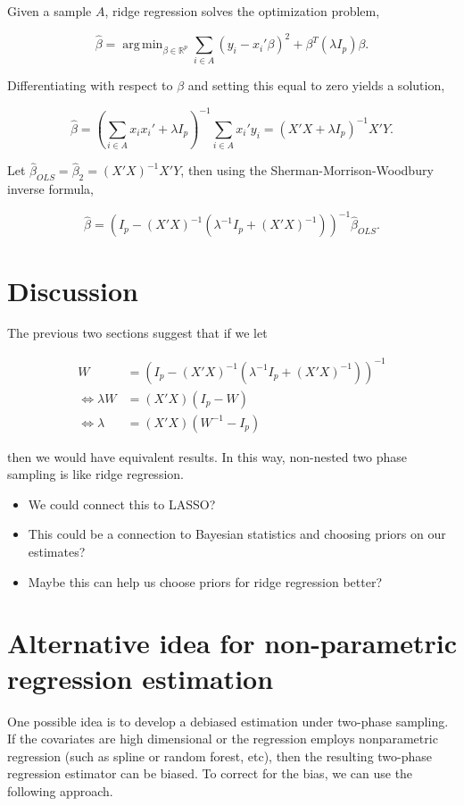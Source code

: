 \documentclass[12pt]{article}
\DeclareMathOperator*{\argmin}{arg\,min}
\newcommand{\R}{\mathbb{R}}
\begin{document}
Given a sample $A$, ridge regression solves the optimization problem,

$$\hat \beta = \argmin_{\beta \in \R^p} \sum_{i \in A} (y_i - x_i'\beta)^2 + \beta^T
(\lambda I_p) \beta.$$

Differentiating with respect to $\beta$ and setting this equal to zero yields a
solution,

$$\hat \beta = \left(\sum_{i \in A} x_i x_i' + \lambda I_p\right)^{-1} \sum_{i
\in A} x_i' y_i = (X'X + \lambda I_p)^{-1} X'Y.$$

Let $\hat \beta_{OLS} = \hat \beta_2 = (X'X)^{-1} X'Y$, then using the
Sherman-Morrison-Woodbury inverse formula,

$$\hat \beta = (I_p - (X'X)^{-1}(\lambda^{-1}I_p + (X'X)^{-1}))^{-1} \hat \beta_{OLS}.$$

\section{Discussion}

The previous two sections suggest that if we let

$$
\begin{aligned}
  W &= (I_p - (X'X)^{-1}(\lambda^{-1}I_p + (X'X)^{-1}))^{-1} \\
  \iff \lambda W &= (X'X)(I_p - W) \\ 
  \iff \lambda &= (X'X)(W^{-1} - I_p)
\end{aligned}
$$

then we would have equivalent results. In this way, non-nested two phase
sampling is like ridge regression.

\begin{itemize}
  \item We could connect this to LASSO?
  \item This could be a connection to Bayesian statistics and choosing priors on
    our estimates?
  \item Maybe this can help us choose priors for ridge regression better?
\end{itemize}


\section{Alternative idea for non-parametric regression estimation}

One possible idea is to develop a debiased estimation under two-phase sampling.
If the covariates are high dimensional or the regression employs nonparametric
regression (such as spline or random forest, etc), then the resulting two-phase
regression estimator can be biased. To correct for the bias, we can use the
following approach.
\end{document}
